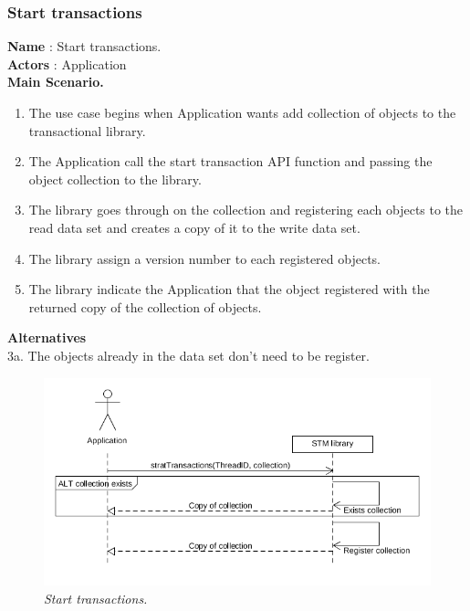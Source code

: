 \documentclass[12pt]{article}
\begin{document}
{\subsubsection{Start transactions}
\textbf{Name} : Start transactions.\\
\textbf{Actors} : Application\\
\textbf{Main Scenario.}
\begin{enumerate}
  \item The use case begins when Application wants add collection of objects to the transactional library.
  \item The Application call the start transaction API function and passing the object collection to the library.
  \item The library goes through on the collection and registering each objects to the read data set and creates  a copy of it to the write data set.
  \item The library assign a version number to each registered objects.
  \item The library indicate the Application that the object registered with the returned copy of the collection of objects.
\end{enumerate}
\textbf{Alternatives}\\
3a. The objects already in the data set don't need to be register.\\

\begin{figure}[h!]
\centering
\includegraphics[scale=0.5]{Pictures/startTransactions.png}
\caption{\textit{\color{gray}Start transactions.}}
\end{figure}

}
\end{document}
